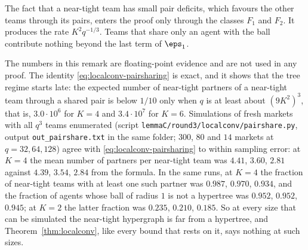 \begin{remark}\label{rem:localconv-pairs}
The fact that a near-tight team has small pair deficits, which favours the other teams
through its pairs, enters the proof only through the classes $F_1$ and $F_2$. It produces
the rate $K^2q^{-1/3}$. Teams that share only an agent with the ball contribute nothing
beyond the last term of $\eps_1$.
\end{remark}

\begin{remark}\label{rem:localconv-size}
The numbers in this remark are floating-point evidence and are not used in any proof. The
identity \eqref{eq:localconv-pairsharing} is exact, and it shows that the tree regime
starts late: the expected number of near-tight partners of a near-tight team through a
shared pair is below $1/10$ only when $q$ is at least about $(9K^2)^3$, that is, $3.0\cdot10^6$ for
$K=4$ and $3.4\cdot10^7$ for $K=6$. Simulations of fresh markets with all $q^3$ teams
enumerated (script \texttt{lemmaC/round3/localconv/pairshare.py}, output
\texttt{out\_pairshare.txt} in the same folder; $300$, $80$ and $14$ markets at
$q=32,64,128$) agree with \eqref{eq:localconv-pairsharing} to within sampling error: at
$K=4$ the mean number of partners per near-tight team was $4.41$, $3.60$, $2.81$ against
$4.39$, $3.54$, $2.84$ from the formula. In the same runs, at $K=4$ the fraction of
near-tight teams with at least one such partner was $0.987$, $0.970$, $0.934$, and the
fraction of agents whose ball of radius $1$ is not a hypertree was $0.952$, $0.952$,
$0.945$; at $K=2$ the latter fraction was $0.235$, $0.210$, $0.185$. So at every size that
can be simulated the near-tight hypergraph is far from a hypertree, and
Theorem~\ref{thm:localconv}, like every bound that rests on it, says nothing at such sizes.
\end{remark}
